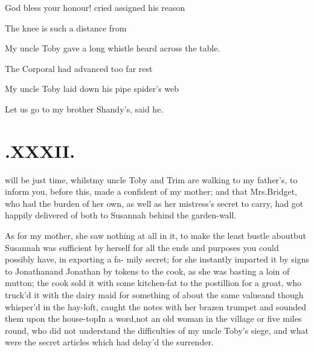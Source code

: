 \documentclass[twoside]{article}
\begin{document}
\tsh God bless your honour! cried\break
{} 
assigned his reason\tsh{}

\lqq The knee is such a distance from\break
{}

My uncle Toby gave a long whistle\break
{} 
heard across the table.

The Corporal had advanced too far\break
{} 
rest\tsh

My uncle Toby laid down his pipe\break
{}
spider’s web\tsh

\tsh Let us go to my brother\break 
Shandy’s, said he.

\vfill{}\eject

\section{\chapstrut{}.\enspace XXXII.}

 will be just time, whilst\break my
uncle Toby and Trim are walking to my father’s,
to inform you,\break
{} before this,
made a confident of my mother; and that Mrs.\@ Bridget, who
had the burden of her own, as well as her mistress’s secret
to carry, had got happily delivered of both to Susannah
behind the garden-wall.

As for my mother, she saw nothing at all in it, to make the
least bustle about\break\tsh but Susannah was sufficient
by herself for all the ends and purposes you could possibly have,
in exporting a fa- mily secret; for she instantly imparted it by
signs to Jonathan\tsh and Jonathan by tokens
to the cook, as she was basting a loin of mutton; the cook sold it
with some kitchen-fat to the postillion for a groat, who
truck’d it with the dairy maid for something of about the
same value\tsh and though whisper’d in the hay-loft,
 caught the notes with her brazen trumpet and
sounded them upon the house-top\tsk In a word,\break not an old woman
in the village or five miles round, who did not understand the
difficulties of my uncle Toby’s siege, and what were
the secret articles which had delay’d the
surrender.\tsh
\end{document}
